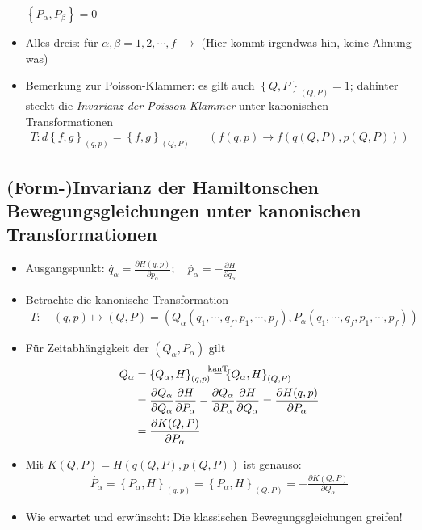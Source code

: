 \begin{itemize}
$\left\{ P_{\alpha}, P_{\beta} \right\} = 0$

\item Alles dreis: für $\alpha,\beta = 1,2,\cdots,f$
  $\rightarrow$ (Hier kommt irgendwas hin, keine Ahnung was)

\item Bemerkung zur Poisson-Klammer: es gilt auch
  $\left\{ Q,P \right\}_{(Q,P)} = 1$; dahinter steckt die
  \emph{Invarianz der Poisson-Klammer} unter kanonischen
  Transformationen
\begin{align*}
T: d \left\{ f,g \right\}_{(q,p)} = \left\{ f,g \right\}_{(Q,P)}
&&\left(f(q,p) \rightarrow f(q(Q,P), p(Q,P)) \right) 
\end{align*}
\end{itemize}


\subsection{(Form-)Invarianz der Hamiltonschen Bewegungsgleichungen
  unter kanonischen Transformationen}
\begin{itemize}
\item Ausgangspunkt:
  $\dot{q_{\alpha}} = \frac{\partial H(q,p)}{\partial
    p_{\alpha}};\quad \dot{p_{\alpha}} = - \frac{\partial H}{\partial
    q_{\alpha}}$
\item Betrachte die kanonische Transformation
  \begin{align*}
    T:\quad (q,p) \mapsto (Q,P) = \left(
    Q_{\alpha}(q_1,\cdots,q_f,p_1,\cdots,p_f ),
    P_{\alpha}(q_1,\cdots,q_f,p_1,\cdots,p_f) \right)
  \end{align*}
\item Für Zeitabhängigkeit der $\left( Q_{\alpha}, P_{\alpha} \right)$
  gilt
  \begin{align*}
    \dot{Q_{\alpha}}
    &= \left\{ Q_{\alpha}, H \right\}_{(q,p)}
      \stackrel{\mathclap{\text{kanT}}}{=} \left\{ Q_{\alpha}, H \right\}_{(Q,P)}\\
    &= \frac{\partial Q_{\alpha}}{\partial Q_{\alpha}}\frac{\partial H}{\partial P_{\alpha}}
      - \frac{\partial Q_{\alpha}}{\partial P_{\alpha}}\frac{\partial H}{\partial Q_{\alpha}}
      = \frac{\partial H(q,p)}{\partial P_{\alpha}}\\
    &= \frac{\partial K(Q,P)}{\partial P_{\alpha}}
  \end{align*}
\item Mit $K(Q,P) = H(q(Q,P),p(Q,P))$ ist genauso:
  \begin{align*}
    \dot{P_{\alpha}} = \left\{ P_{\alpha}, H \right\}_{(q,p)} = \left\{
    P_{\alpha},H \right\}_{(Q,P)} = - \frac{\partial K(Q,P)}{\partial
    Q_{\alpha}}
\end{align*}

\item Wie erwartet und erwünscht: Die klassischen Bewegungsgleichungen
  greifen!
\end{itemize}

